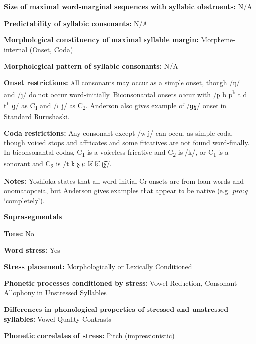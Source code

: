 \textbf{Size of maximal word{}-marginal sequences with syllabic obstruents:} N/A



\textbf{Predictability of syllabic consonants:} N/A



\textbf{Morphological constituency of maximal syllable margin:} Morpheme-internal (Onset, Coda)



\textbf{Morphological pattern of syllabic consonants:} N/A



\textbf{Onset restrictions:} All consonants may occur as a simple onset, though /ŋ/ and /j/ do not occur word-initially. Biconsonantal onsets occur with /p b p\textsuperscript{h} t d t\textsuperscript{h} ɡ/ as C\textsubscript{1} and /ɾ j/ as C\textsubscript{2}. Anderson also gives example of /ɡɣ/ onset in Standard Burushaski.



\textbf{Coda restrictions:} Any consonant except /w j/ can occur as simple coda, though voiced stops and affricates and some fricatives are not found word-finally. In biconsonantal codas, C\textsubscript{1} is a voiceless fricative and C\textsubscript{2} is /k/, or C\textsubscript{1} is a sonorant and C\textsubscript{2} is /t k ʂ ɕ t͡s t͡ɕ ʈ͡ʂ/. 



\textbf{Notes:} Yoshioka states that all word-initial Cr onsets are from loan words and onomatopoeia, but Anderson gives examples that appear to be native (e.g. \textit{pra:q} ‘completely’).



\textbf{Suprasegmentals}



\textbf{Tone:} No



\textbf{Word stress:} Yes



\textbf{Stress placement:} Morphologically or Lexically Conditioned



\textbf{Phonetic processes conditioned by stress:} Vowel Reduction, Consonant Allophony in Unstressed Syllables



\textbf{Differences in phonological properties of stressed and unstressed syllables:} Vowel Quality Contrasts



\textbf{Phonetic correlates of stress:} Pitch (impressionistic)



